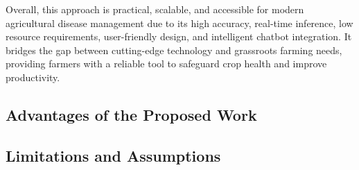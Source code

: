 Overall, this approach is practical, scalable, and accessible for modern agricultural disease management due to its high accuracy, real-time inference, low resource requirements, user-friendly design, and intelligent chatbot integration. It bridges the gap between cutting-edge technology and grassroots farming needs, providing farmers with a reliable tool to safeguard crop health and improve productivity.



\subsection{Advantages of the Proposed Work}



\subsection{Limitations and Assumptions}



